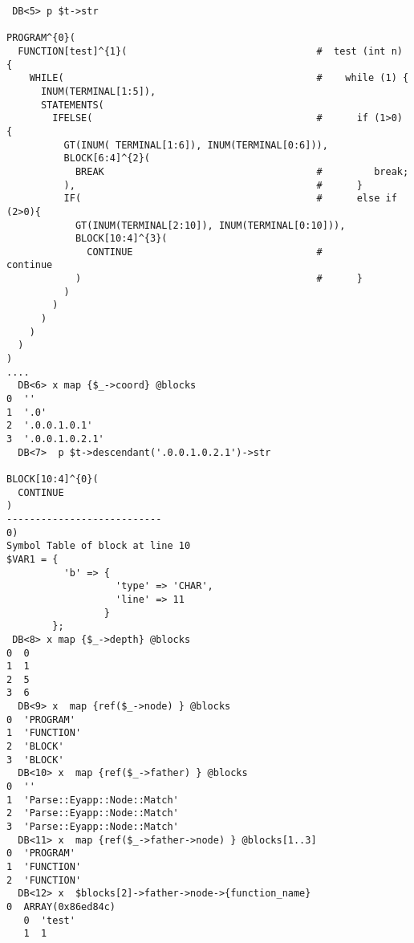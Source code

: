 \begin{verbatim}
 DB<5> p $t->str

PROGRAM^{0}(
  FUNCTION[test]^{1}(                                 #  test (int n) {
    WHILE(                                            #    while (1) {
      INUM(TERMINAL[1:5]),
      STATEMENTS(
        IFELSE(                                       #      if (1>0) {
          GT(INUM( TERMINAL[1:6]), INUM(TERMINAL[0:6])),
          BLOCK[6:4]^{2}(
            BREAK                                     #         break;
          ),                                          #      }
          IF(                                         #      else if (2>0){
            GT(INUM(TERMINAL[2:10]), INUM(TERMINAL[0:10])),
            BLOCK[10:4]^{3}(
              CONTINUE                                #         continue
            )                                         #      }
          )
        )
      )
    )
  )
)
....
  DB<6> x map {$_->coord} @blocks
0  ''
1  '.0'
2  '.0.0.1.0.1'
3  '.0.0.1.0.2.1'
  DB<7>  p $t->descendant('.0.0.1.0.2.1')->str

BLOCK[10:4]^{0}(
  CONTINUE
)
---------------------------
0)
Symbol Table of block at line 10
$VAR1 = {
          'b' => {
                   'type' => 'CHAR',
                   'line' => 11
                 }
        };
 DB<8> x map {$_->depth} @blocks
0  0
1  1
2  5
3  6
  DB<9> x  map {ref($_->node) } @blocks
0  'PROGRAM'
1  'FUNCTION'
2  'BLOCK'
3  'BLOCK'
  DB<10> x  map {ref($_->father) } @blocks
0  ''
1  'Parse::Eyapp::Node::Match'
2  'Parse::Eyapp::Node::Match'
3  'Parse::Eyapp::Node::Match'
  DB<11> x  map {ref($_->father->node) } @blocks[1..3]
0  'PROGRAM'
1  'FUNCTION'
2  'FUNCTION'
  DB<12> x  $blocks[2]->father->node->{function_name}
0  ARRAY(0x86ed84c)
   0  'test'
   1  1
\end{verbatim}


